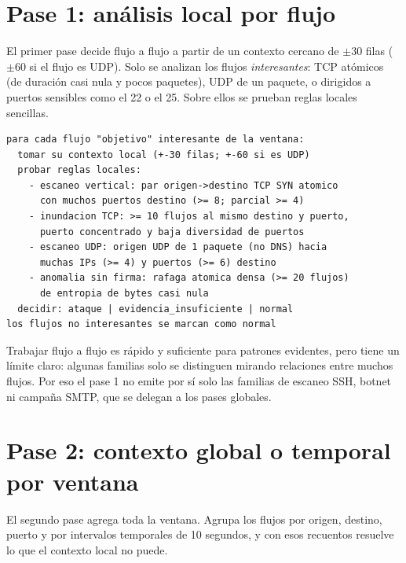 \section{Pase 1: análisis local por flujo}
\label{sec:apd_pase1}

El primer pase decide flujo a flujo a partir de un contexto cercano de $\pm 30$ filas ($\pm 60$ si el flujo es UDP). Solo se analizan los flujos \emph{interesantes}: TCP atómicos (de duración casi nula y pocos paquetes), UDP de un paquete, o dirigidos a puertos sensibles como el 22 o el 25. Sobre ellos se prueban reglas locales sencillas.

\begin{small}
\begin{verbatim}
para cada flujo "objetivo" interesante de la ventana:
  tomar su contexto local (+-30 filas; +-60 si es UDP)
  probar reglas locales:
    - escaneo vertical: par origen->destino TCP SYN atomico
      con muchos puertos destino (>= 8; parcial >= 4)
    - inundacion TCP: >= 10 flujos al mismo destino y puerto,
      puerto concentrado y baja diversidad de puertos
    - escaneo UDP: origen UDP de 1 paquete (no DNS) hacia
      muchas IPs (>= 4) y puertos (>= 6) destino
    - anomalia sin firma: rafaga atomica densa (>= 20 flujos)
      de entropia de bytes casi nula
  decidir: ataque | evidencia_insuficiente | normal
los flujos no interesantes se marcan como normal
\end{verbatim}
\end{small}

Trabajar flujo a flujo es rápido y suficiente para patrones evidentes, pero tiene un límite claro: algunas familias solo se distinguen mirando relaciones entre muchos flujos. Por eso el pase 1 no emite por sí solo las familias de escaneo SSH, botnet ni campaña SMTP, que se delegan a los pases globales.

\section{Pase 2: contexto global o temporal por ventana}
\label{sec:apd_pase2}

El segundo pase agrega toda la ventana. Agrupa los flujos por origen, destino, puerto y por intervalos temporales de 10 segundos, y con esos recuentos resuelve lo que el contexto local no puede.


